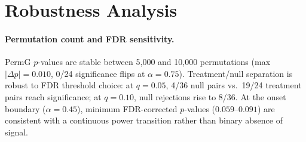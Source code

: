 \begin{table}[H]
\centering
\small
\caption{Observation window sensitivity for Tier~3 consensus ($K{\geq}4/5$) at $\alpha{=}1.0$ (Pythia-410M, 4~seeds). Tier~3 pairs: number of canary$\to$downstream pairs (out of 8 validated) reaching $K{\geq}4/5$ method agreement. TY pairs: number of effect-size reference pairs (out of 6) reaching Toda--Yamamoto significance (moderate supplementary method; \S\ref{sec:method}). Consensus stabilizes at $T_{\min}{\geq}5$; TY stabilizes at $T_{\min}{\geq}6$.}
\label{tab:window_sensitivity}
\end{table}


\section{Robustness Analysis}
\label{app:robustness}
\label{app:spec_curve}

\paragraph{Permutation count and FDR sensitivity.}
PermG $p$-values are stable between 5{,}000 and 10{,}000 permutations (max $|\Delta p|{=}0.010$, 0/24 significance flips at $\alpha{=}0.75$).
Treatment/null separation is robust to FDR threshold choice: at $q{=}0.05$, 4/36 null pairs vs.\ 19/24 treatment pairs reach significance; at $q{=}0.10$, null rejections rise to 8/36.
At the onset boundary ($\alpha{=}0.45$), minimum FDR-corrected $p$-values ($0.059$--$0.091$) are consistent with a continuous power transition rather than binary absence of signal.

